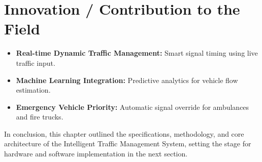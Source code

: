 \section{Innovation / Contribution to the Field}
\begin{itemize}
\item \textbf{Real-time Dynamic Traffic Management:} Smart signal timing using live traffic input.
\item \textbf{Machine Learning Integration:} Predictive analytics for vehicle flow estimation.
\item \textbf{Emergency Vehicle Priority:} Automatic signal override for ambulances and fire trucks.
\end{itemize}

\vspace{0.5cm}
In conclusion, this chapter outlined the specifications, methodology, and core architecture of the Intelligent Traffic Management System, setting the stage for hardware and software implementation in the next section.